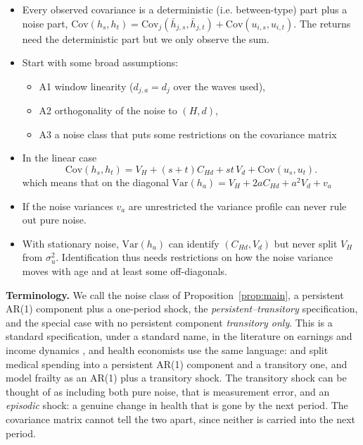 \documentclass[11pt]{article}
\newcommand{\Var}{\mathrm{Var}}
\newcommand{\Cov}{\mathrm{Cov}}
\begin{document}
	\begin{itemize}
		\item Every observed covariance is a deterministic (i.e. between-type) part plus a noise part, $\Cov(h_s,h_t)=\Cov_j(\bar h_{j,s},\bar h_{j,t})+\Cov(u_{i,s},u_{i,t})$. The returns need the deterministic part but we only observe the sum. 
		\item Start with some broad assumptions: 
		\begin{itemize}
			\item A1 window linearity ($d_{j,a}=d_j$ over the waves used), 
			\item A2 orthogonality of the noise to $(H,d)$, 
			\item A3 a noise class that puts some restrictions on the covariance matrix
		\end{itemize}
		\item In the linear case
		\begin{equation}
			\Cov(h_s,h_t)=V_H+(s+t)C_{Hd}+st\,V_d+\Cov(u_s,u_t).
			\label{eq:forward}
		\end{equation}
		which means that on the diagonal $\Var(h_a)=V_H+2aC_{Hd}+a^2V_d+v_a$
		\item If the noise variances $v_a$ are unrestricted the variance profile can never rule out pure noise. 
		\item With stationary noise, $\Var(h_a)$ can identify $(C_{Hd},V_d)$ but never split $V_H$ from $\sigma^2_u$. Identification thus needs restrictions on how the noise variance moves with age and at least some off-diagonals.
	\end{itemize}
	
	\textbf{Terminology.} We call the noise class of Proposition~\ref{prop:main}, a persistent AR(1) component plus a one-period shock, the \emph{persistent--transitory} specification, and the special case with no persistent component \emph{transitory only}. This is a standard specification, under a standard name, in the literature on earnings and income dynamics \citep{macurdy1982,abowd1989,meghir2004,blundell2008}, and health economists use the same language: \citet{frenchjones2004} and \citet{denardi2010} split medical spending into a persistent AR(1) component and a transitory one, and \citet{hosseini2022} model frailty as an AR(1) plus a transitory shock. The transitory shock can be thought of as including both pure noise, that is measurement error, and an \emph{episodic} shock: a genuine change in health that is gone by the next period. The covariance matrix cannot tell the two apart, since neither is carried into the next period.
	
\end{document}
